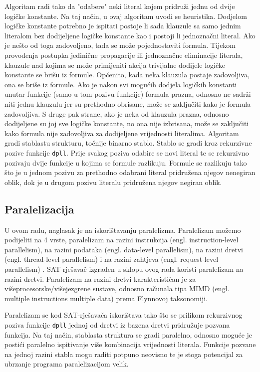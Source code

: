\documentclass[conference]{IEEEtran}
\begin{document}
Algoritam radi tako da "odabere" neki literal kojem pridruži jednu od dvije logičke konstante. Na taj način, u ovaj algoritam uvodi se heuristika. Dodjelom logičke konstante potrebno je ispitati postoje li sada klauzule sa samo jednim literalom bez dodijeljene logičke konstante kao i postoji li jednoznačni literal. Ako je nešto od toga zadovoljeno, tada se može pojednostaviti formula. Tijekom provođenja postupka jedinične propagacije ili jednoznačne eliminacije literala, klauzule nad kojima se može primijeniti akcija trivijalne dodijele logičke konstante se brišu iz formule. Općenito, kada neka klauzula postaje zadovoljiva, ona se briše iz formule. Ako je nakon svi mogućih dodjela logičkih konstanti unutar funkcije (samo u tom pozivu funkcije) formula prazna, odnosno ne sadrži niti jednu klauzulu jer su prethodno obrisane, može se zaključiti kako je formula zadovoljiva. S druge pak strane, ako je neka od klauzula prazna, odnosno dodijeljene su joj sve logičke konstante, no ona nije izbrisana, može se zaključiti kako formula nije zadovoljiva za dodijeljene vrijednosti literalima. Algoritam gradi stablastu strukturu, točnije binarno stablo. Stablo se gradi kroz rekurzivne pozive funkcije \texttt{dpll}. Prije svakog poziva odabire se novi literal te se rekurzivno pozivaju dvije funkcije u kojima se formule razlikuju. Formule se razlikuju tako što je u jednom pozivu za prethodno odabrani literal pridružena njegov nenegiran oblik, dok je u drugom pozivu literalu pridružena njegov negiran oblik.

\subsection{Paralelizacija}
U ovom radu, naglasak je na iskorištavanju paralelizma. Paralelizam možemo podijeliti na 4 vrste, paralelizam na razini instrukcija (engl. instruction-level parallelism), na razini podataka (engl. data-level parallelism), na razini dretvi (engl. thread-level parallelism) i na razini zahtjeva (engl. request-level parallelism) \cite{b3}. SAT-rješavač izgrađen u sklopu ovog rada koristi paralelizam na razini dretvi. Paralelizam na razini dretvi karakterističan je za višeprocesorske/višejezgrene sustave, odnosno računala tipa MIMD (engl. multiple instructions multiple data) prema Flynnovoj taksonomiji.

Paralelizam se kod SAT-rješavača iskorištava tako što se prilikom rekurzivnog poziva funkcije \texttt{dpll} jednoj od dretvi iz bazena dretvi pridružuje pozvana funkcija. Na taj način, stablasta struktura se gradi paralelno, odnosno moguće je postići paralelno ispitivanje više kombinacija vrijednosti literala. Funkcije pozvane na jednoj razini stabla mogu raditi potpuno neovisno te je stoga potencijal za ubrzanje programa paralelizacijom velik.
\end{document}
